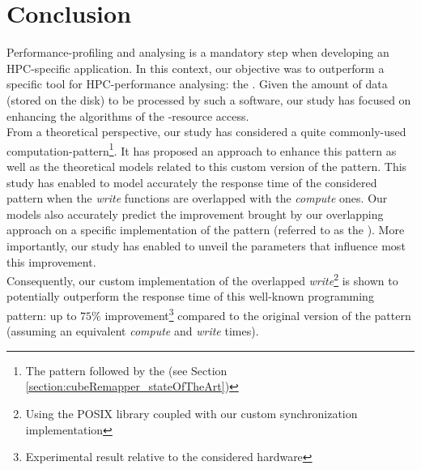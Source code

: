 



\chapter{Conclusion}


	Performance-profiling and analysing is a mandatory step when developing an HPC-specific application.   In this context, our objective was to outperform a specific tool for HPC-performance analysing: the \toolTargetSoftware.   Given the amount of data (stored on the \notationIO\space disk) to be processed by such a software, our study has focused on enhancing the algorithms of the \notationIO-resource access.\\

	From a theoretical perspective, our study has considered a quite commonly-used computation-pattern\footnote{The pattern followed by the \toolTargetSoftware\space (see Section \ref{section:cubeRemapper_stateOfTheArt})}.   It has proposed an \notationaio\space approach to enhance this pattern as well as the theoretical models related to this custom version of the pattern.   This study has enabled to model accurately the response time of the considered pattern when the \notationIO\space \emph{write} functions are overlapped with the \emph{compute} ones.   Our models also accurately predict the improvement brought by our overlapping approach on a specific implementation of the \toolTargetSoftware\space pattern (referred to as the \emph{\toolSimulationSoftware}).   More importantly, our study has enabled to unveil the parameters that influence most this improvement.\\

	Consequently, our custom implementation of the overlapped \notationIO\space \emph{write}\footnote{Using the POSIX \notationaioShort\space library coupled with our custom synchronization implementation} is shown to potentially outperform the response time of this well-known programming pattern: up to $75\%$ improvement\footnote{Experimental result relative to the considered hardware} compared to the original version of the pattern (assuming an equivalent \emph{compute} and \emph{write} times).\\

